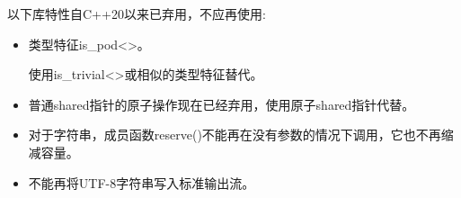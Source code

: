 



以下库特性自C++20以来已弃用，不应再使用:

\begin{itemize}
\item 
类型特征is\_pod<>。

使用is\_trivial<>或相似的类型特征替代。

\item 
普通shared指针的原子操作现在已经弃用，使用原子shared指针代替。
\end{itemize}




\begin{itemize}
\item 
对于字符串，成员函数reserve()不能再在没有参数的情况下调用，它也不再缩减容量。

\item 
不能再将UTF-8字符串写入标准输出流。
\end{itemize}



